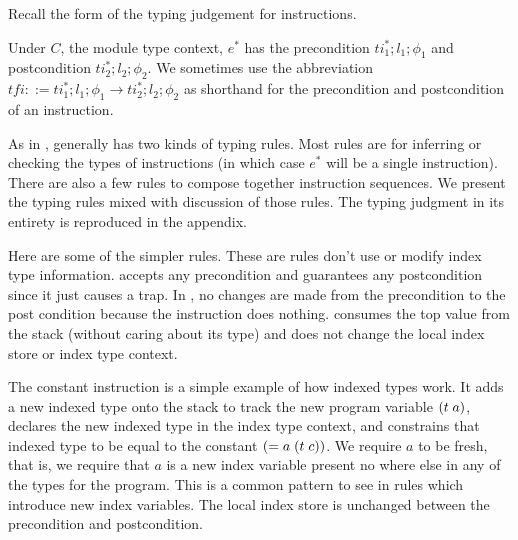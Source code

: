 Recall the form of the \name typing judgement for instructions.
\begin{mathpar}
\end{mathpar}

Under $C$, the module type context, $e^{*}$ has the precondition $ti_1^{*};l_1;\phi_1$ and postcondition $ti_2^{*};l_2;\phi_2$.
We sometimes use the abbreviation $tfi ::= ti_1^{*};l_1;\phi_1 \rightarrow ti_2^{*};l_2;\phi_2$ as shorthand for the precondition and postcondition of an instruction.

As in \wasm, \name generally has two kinds of typing rules.
Most rules are for inferring or checking the types of instructions (in which case $e^{*}$ will be a single instruction).
There are also a few rules to compose together instruction sequences.
We present the typing rules mixed with discussion of those rules.
The typing judgment in its entirety is reproduced in the appendix.

Here are some of the simpler rules.
These are rules don't use or modify index type information.
 accepts any precondition and guarantees any postcondition since it just causes a trap.
In , no changes are made from the precondition to the post condition because the instruction does nothing.
 consumes the top value from the stack (without caring about its type) and does not change the local index store or index type context.
\begin{mathpar}


\end{mathpar}

The constant instruction is a simple example of how indexed types work.
It adds a new indexed type onto the stack to track the new program variable $\ti{t}{a}$, declares the new indexed type in the index type context, and constrains that indexed type to be equal to the constant $(= a\; \ti{t}{c})$.
We require $a$ to be fresh, that is, we require that $a$ is a new index variable present no where else in any of the types for the program.
This is a common pattern to see in rules which introduce new index variables.
The local index store is unchanged between the precondition and postcondition.
\begin{mathpar}
\end{mathpar}

